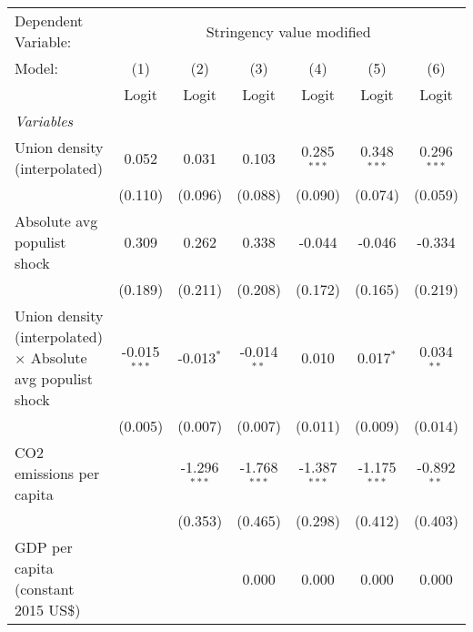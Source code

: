 
\begingroup
\centering
\begin{tabular}{lcccccc}
   \toprule
   Dependent Variable: & \multicolumn{6}{c}{Stringency value modified}\\
   Model:                                                             & (1)            & (2)            & (3)            & (4)            & (5)            & (6)\\  
                                                                      &  Logit         & Logit          & Logit          & Logit          & Logit          & Logit\\  
   \midrule
   \emph{Variables}\\
   Union density (interpolated)                                       & 0.052          & 0.031          & 0.103          & 0.285$^{***}$  & 0.348$^{***}$  & 0.296$^{***}$\\   
                                                                      & (0.110)        & (0.096)        & (0.088)        & (0.090)        & (0.074)        & (0.059)\\   
   Absolute avg populist shock                                        & 0.309          & 0.262          & 0.338          & -0.044         & -0.046         & -0.334\\   
                                                                      & (0.189)        & (0.211)        & (0.208)        & (0.172)        & (0.165)        & (0.219)\\   
   Union density (interpolated) $\times$ Absolute avg populist shock  & -0.015$^{***}$ & -0.013$^{*}$   & -0.014$^{**}$  & 0.010          & 0.017$^{*}$    & 0.034$^{**}$\\   
                                                                      & (0.005)        & (0.007)        & (0.007)        & (0.011)        & (0.009)        & (0.014)\\   
   CO2 emissions per capita                                           &                & -1.296$^{***}$ & -1.768$^{***}$ & -1.387$^{***}$ & -1.175$^{***}$ & -0.892$^{**}$\\   
                                                                      &                & (0.353)        & (0.465)        & (0.298)        & (0.412)        & (0.403)\\   
   GDP per capita (constant 2015 US\$)                                &                &                & 0.000          & 0.000          & 0.000          & 0.000\\   

\end{tabular}
